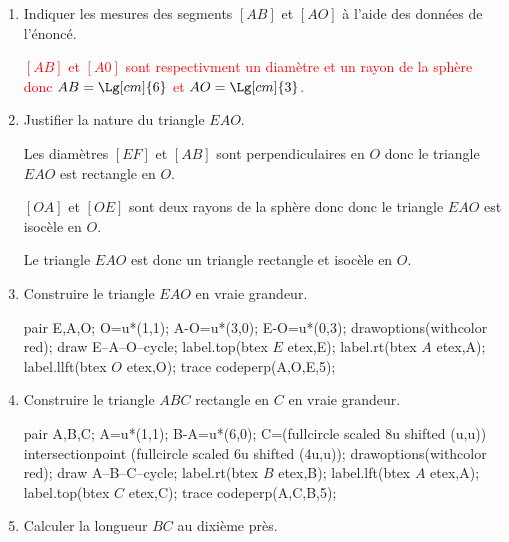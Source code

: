 \begin{corrige}
    \begin{enumerate}
        \item Indiquer les mesures des segments $[AB]$ et $[AO]$ à l'aide des données de l'énoncé.
        
        \textcolor{red}{$[AB]$ et $[A0]$ sont respectivment un diamètre et un rayon de la sphère donc $AB=\Lg[cm]{6}$ et $AO=\Lg[cm]{3}$.}
    \end{enumerate}
    \Coupe
    \begin{enumerate}
        \setcounter{enumi}{1}
        \item Justifier la nature du triangle $EAO$.
        
        {\color{red}%
        Les diamètres $[EF]$ et $[AB]$ sont perpendiculaires en $O$ donc le triangle $EAO$ est rectangle en $O$.

        $[OA]$ et $[OE]$ sont deux rayons de la sphère donc donc le triangle $EAO$ est isocèle en $O$.

        Le triangle $EAO$ est donc un triangle rectangle et isocèle en $O$.
        }
        \item Construire le triangle $EAO$ en vraie grandeur.
        
        \begin{Geometrie}
            pair E,A,O;
            O=u*(1,1);
            A-O=u*(3,0);
            E-O=u*(0,3);
            drawoptions(withcolor red);
            draw E--A--O--cycle;
            label.top(btex $E$ etex,E);
            label.rt(btex $A$ etex,A);
            label.llft(btex $O$ etex,O);
            trace codeperp(A,O,E,5);
        \end{Geometrie}
        \item Construire le triangle $ABC$ rectangle en $C$ en vraie \mbox{grandeur}.
        
        \begin{Geometrie}
            pair A,B,C;
            A=u*(1,1);
            B-A=u*(6,0);
            C=(fullcircle scaled 8u shifted (u,u)) intersectionpoint (fullcircle scaled 6u shifted (4u,u));
            drawoptions(withcolor red);
            draw A--B--C--cycle;
            label.rt(btex $B$ etex,B);
            label.lft(btex $A$ etex,A);
            label.top(btex $C$ etex,C);
            trace codeperp(A,C,B,5);
        \end{Geometrie}
        \item Calculer la longueur $BC$ au dixième près.
        
        {\color{red}}
    \end{enumerate}
\end{corrige}
